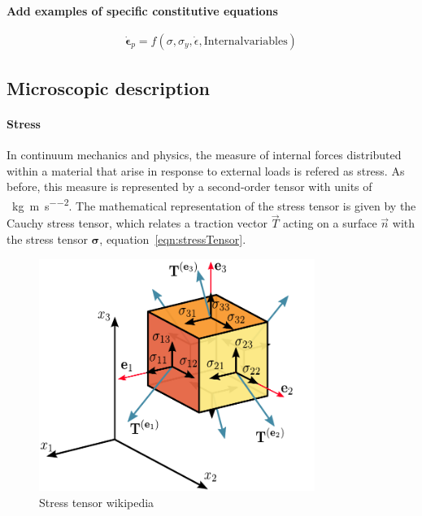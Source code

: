 \textbf{Add examples of specific constitutive equations}

\begin{gather}
    \dot{\bm{\epsilon}}_{p} = f\left(\sigma,\sigma_y,\dot{\epsilon},\mathrm{Internal variables}\right)\label{eqn:viscoplastiEQN}
\end{gather}

\subsection{Microscopic description}

\paragraph{Stress} In continuum mechanics and physics, the measure of internal forces distributed within a material that arise in response to external loads is refered as stress.
As before, this measure is represented by a second-order tensor with units of \SI{}{\kilo\gram\per\meter\per\second\squared}.
The mathematical representation of the stress tensor is given by the Cauchy stress tensor, which relates a traction vector $\vec{T}$ acting on a surface $\vec{n}$ with the stress tensor $\bm{\sigma}$, equation~\eqref{eqn:stressTensor}.

\begin{figure}[ht!]
    \centering
    \includegraphics[width=0.8\textwidth]{figs/Components_stress_tensor_cartesian.pdf}
    \caption{Stress tensor wikipedia}
\end{figure}


